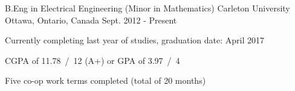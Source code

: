 

\begin{cventries}

  \cventry
    {B.Eng in Electrical Engineering (Minor in Mathematics)} %
    {Carleton University} %
    {Ottawa, Ontario, Canada} %
    {Sept. 2012 - Present} %
    {
      \begin{cvitems} %
        \item {Currently completing last year of studies, graduation date: April 2017}
        \item {CGPA of 11.78~/~12 (A+) or GPA of 3.97~/~4}
        \item {Five co-op work terms completed (total of 20 months)}
      \end{cvitems}
    }

\end{cventries}
